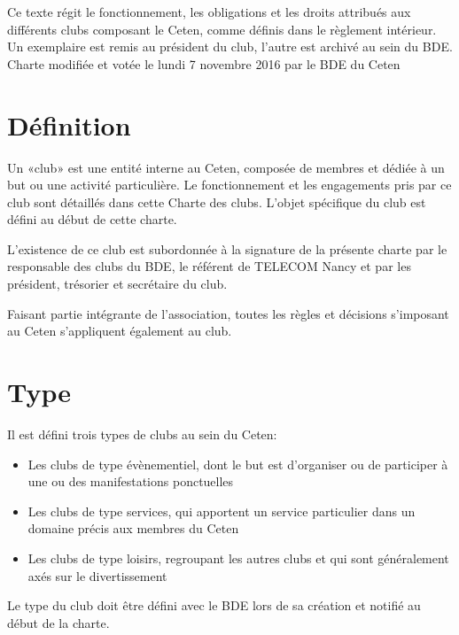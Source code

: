 \documentclass{article}
\begin{document}
\begin{titlepage}
		\vfill
		\begin{center}
			{\footnotesize \light{} Ce texte régit le fonctionnement, les
			obligations et les droits attribués aux différents clubs composant
			le Ceten, comme définis dans le règlement intérieur. Un exemplaire
			est remis au président du club, l’autre est archivé au sein du
			BDE\@.\\
			Charte modifiée et votée le lundi 7 novembre 2016 par le BDE du
			Ceten}
		\end{center}
	\end{titlepage}



	\begin{multicols}{2}
		
		\section{Définition}
\label{sec:definition}
			
		{\small
			
			Un «club» est une entité interne au Ceten, composée de membres et
			dédiée à un but ou une activité particulière. Le fonctionnement et
			les engagements pris par ce club sont détaillés dans cette Charte
			des clubs. L’objet spécifique du club est défini au début de cette
			charte.

			L'existence de ce club est subordonnée à la signature de la présente
			charte par le responsable des clubs du BDE, le référent de TELECOM
			Nancy et par les président, trésorier et secrétaire du club.

			Faisant partie intégrante de l’association, toutes les règles et
			décisions s’imposant au Ceten s’appliquent également au club.
			
			}

		\section{Type}
\label{sec:type}
			
		{\small
		
			Il est défini trois types de clubs au sein du Ceten:
			\begin{itemize}
				\item Les clubs de type évènementiel, dont le but est
					d’organiser ou de participer à une ou des manifestations
					ponctuelles
				\item Les clubs de type services, qui apportent un service
					particulier dans un domaine précis aux membres du Ceten
				\item Les clubs de type loisirs, regroupant les autres clubs et
					qui sont généralement axés sur le divertissement
			\end{itemize}
			Le type du club doit être défini avec le BDE lors de sa création et
			notifié au début de la charte.
			
}
\end{multicols}
\end{document}
